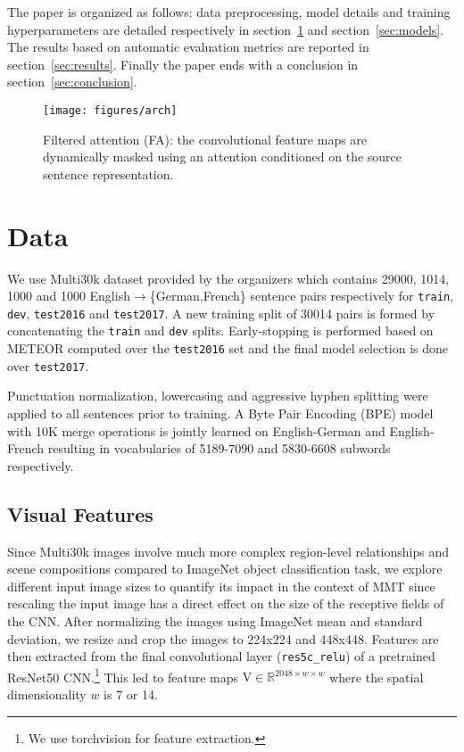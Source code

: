 \documentclass[11pt,a4paper]{article}
\newcommand{\tm}[1] {\texttt{#1}}
\begin{document}
The paper is organized as follows: data preprocessing, model details and training hyperparameters are detailed
respectively in section~\ref{sec:data} and section~\ref{sec:models}.
The results based on automatic evaluation metrics are reported in section~\ref{sec:results}.
Finally the paper ends with a conclusion in section~\ref{sec:conclusion}.

\begin{figure*}[htbp]
\centering
  \texttt{[image: figures/arch]}
  \caption{Filtered attention (FA): the convolutional feature maps are dynamically masked using an attention conditioned on the source sentence representation.}
  \label{fig:arch1}
\end{figure*}

\section{Data}
\label{sec:data}
We use Multi30k \cite{Elliott2016} dataset provided by the organizers which contains 29000, 1014, 1000 and 1000
English$\rightarrow$\{German,French\} sentence pairs respectively for \tm{train}, \tm{dev}, \tm{test2016} and \tm{test2017}.
A new training split of 30014 pairs is formed by concatenating the \tm{train} and \tm{dev} splits. Early-stopping is performed
based on METEOR computed over the \tm{test2016} set and the final model selection is done over \tm{test2017}.

Punctuation normalization, lowercasing and aggressive hyphen splitting were applied to all sentences prior to training.
A Byte Pair Encoding (BPE) model \cite{sennrich2015neural} with 10K merge operations is jointly learned on
English-German and English-French resulting in vocabularies of 5189-7090 and 5830-6608 subwords respectively.
\subsection{Visual Features}

Since Multi30k images involve much more complex region-level relationships and scene compositions compared to
ImageNet \cite{ILSVRC15} object classification task, we explore different input image sizes to quantify
its impact in the context of MMT since rescaling the input image has a direct effect on the size of the receptive fields of the CNN.
After normalizing the images using ImageNet mean and standard deviation, we resize and crop the images to 224x224 and 448x448.
Features are then extracted from the final convolutional layer (\tm{res5c\_relu}) of a pretrained ResNet50 \cite{he2016resnet} CNN.\footnote{We use torchvision for feature extraction.}
This led to feature maps $\mathrm{V} \in \mathbb{R}^{2048\times w\times w}$ where the spatial dimensionality $w$ is 7 or 14.
\end{document}
